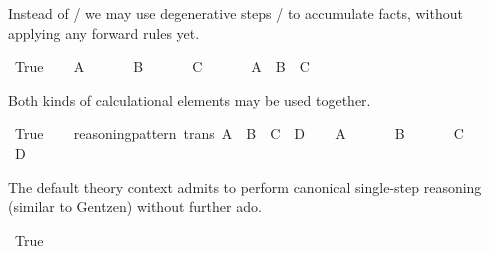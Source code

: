 \begin{isabellebody}
%
\isamarkuptrue%
%
\begin{isamarkuptext}%
Instead of / we may use degenerative steps
  / to accumulate facts, without
  applying any forward rules yet.%
\end{isamarkuptext}%
\isamarkuptrue%
\ True\isanewline
\isamarkupfalse%
\isanewline
\ \ \isamarkupfalse%
\ A\ \isamarkupfalse%
\isanewline
\ \ \isamarkupfalse%
\ \isamarkupfalse%
\ B\ \isamarkupfalse%
\isanewline
\ \ \isamarkupfalse%
\ \isamarkupfalse%
\ C\ \isamarkupfalse%
\isanewline
\ \ \isamarkupfalse%
\ \isamarkupfalse%
\ A\ \ B\ \ C\ \isamarkupfalse%
\isacommand{{\isachardot}}\ \ %
\isanewline
\isamarkupfalse%
\isamarkupfalse%
%
\begin{isamarkuptext}%
Both kinds of calculational elements may be used together.%
\end{isamarkuptext}%
\isamarkuptrue%
\ True\isanewline
\isamarkupfalse%
\isanewline
\ \ \isamarkupfalse%
\ reasoning{\isacharunderscore}pattern\ {\isacharbrackleft}trans{\isacharbrackright}{\isacharcolon}\ {\isachardoublequote}A\ {\isasymLongrightarrow}\ B\ {\isasymLongrightarrow}\ C\ {\isasymLongrightarrow}\ D{\isachardoublequote}\isanewline
\ \ \isamarkupfalse%
\ A\ \isamarkupfalse%
\isanewline
\ \ \isamarkupfalse%
\ \isamarkupfalse%
\ B\ \isamarkupfalse%
\isanewline
\ \ \isamarkupfalse%
\ \isamarkupfalse%
\ C\ \isamarkupfalse%
\isanewline
\ \ \isamarkupfalse%
\ \isamarkupfalse%
\ D\ \isamarkupfalse%
\isacommand{{\isachardot}}\isanewline
\isamarkupfalse%
\isamarkupfalse%
%
\isamarkuptrue%
%
\isamarkuptrue%
%
\begin{isamarkuptext}%
The default theory context admits to perform canonical single-step
  reasoning (similar to Gentzen) without further ado.%
\end{isamarkuptext}%
\isamarkuptrue%
\ True\isanewline

\end{isabellebody}
